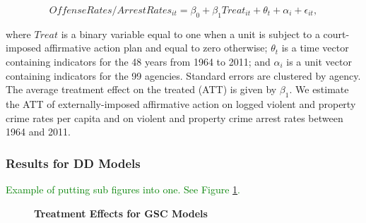 \documentclass[12pt, letterpage]{article}
\begin{document}
\begin{equation} \label{eq:2wfe}
    OffenseRates/ArrestRates_{it} = \beta_{0} + \beta_{1}Treat_{it} + \theta_{t} + \alpha_{i} + \epsilon_{it},
\end{equation}

\noindent where $Treat$ is a binary variable equal to one when a unit is subject to a court-imposed affirmative action plan and equal to zero otherwise; $\theta_{t}$ is a time vector containing indicators for the 48 years from 1964 to 2011; and $\alpha_{i}$ is a unit vector containing indicators for the 99 agencies. Standard errors are clustered by agency. The average treatment effect on the treated (ATT) is given by $\beta_{1}$. We estimate the ATT of externally-imposed affirmative action on logged violent and property crime rates per capita and on violent and property crime arrest rates between 1964 and 2011.

\subsubsection{Results for DD Models}

\textcolor{green}{Example of putting sub figures into one. See Figure \ref{fig:hist}.}
\begin{figure}[!h]
\centering
{}
\caption{\textbf{Treatment Effects for GSC Models}}
\label{fig:hist}
\end{figure}
\end{document}
